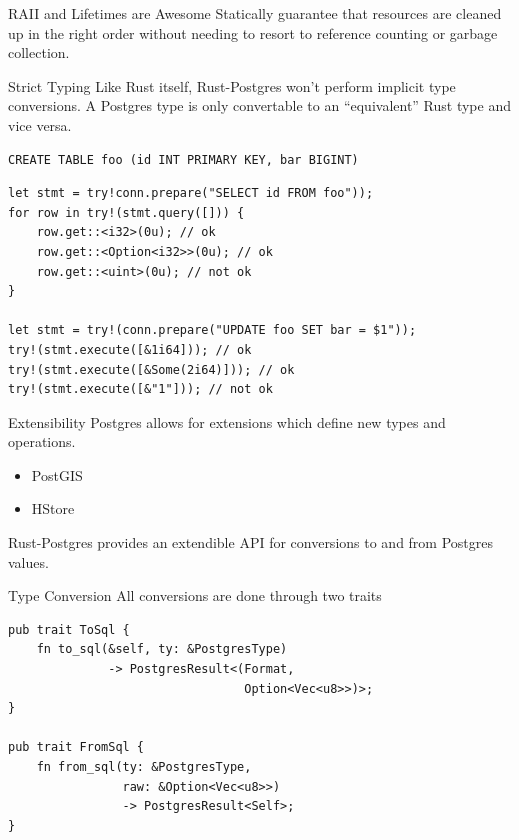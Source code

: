 \documentclass{beamer}
\begin{document}
\begin{frame}[fragile]{RAII and Lifetimes are Awesome}
    Statically guarantee that resources are cleaned up in the right order
    without needing to resort to reference counting or garbage collection.
\end{frame}

\begin{frame}[fragile]{Strict Typing}
    Like Rust itself, Rust-Postgres won't perform implicit type conversions. A
    Postgres type is only convertable to an ``equivalent'' Rust type and vice
    versa.
    \begin{verbatim}
CREATE TABLE foo (id INT PRIMARY KEY, bar BIGINT) 
    \end{verbatim}
    \begin{verbatim}
let stmt = try!conn.prepare("SELECT id FROM foo"));
for row in try!(stmt.query([])) {
    row.get::<i32>(0u); // ok
    row.get::<Option<i32>>(0u); // ok
    row.get::<uint>(0u); // not ok
}

let stmt = try!(conn.prepare("UPDATE foo SET bar = $1"));
try!(stmt.execute([&1i64])); // ok
try!(stmt.execute([&Some(2i64)])); // ok
try!(stmt.execute([&"1"])); // not ok
    \end{verbatim}
\end{frame}

\begin{frame}{Extensibility}
    Postgres allows for extensions which define new types and operations.
    \begin{itemize}
        \item PostGIS
        \item HStore
    \end{itemize}

    Rust-Postgres provides an extendible API for conversions to and from
    Postgres values.
\end{frame}

\begin{frame}[fragile]{Type Conversion}
    All conversions are done through two traits
    \begin{verbatim}
pub trait ToSql {
    fn to_sql(&self, ty: &PostgresType)
              -> PostgresResult<(Format,
                                 Option<Vec<u8>>)>;
} 

pub trait FromSql {
    fn from_sql(ty: &PostgresType,
                raw: &Option<Vec<u8>>)
                -> PostgresResult<Self>;
}
    \end{verbatim}
\end{frame}
\end{document}
